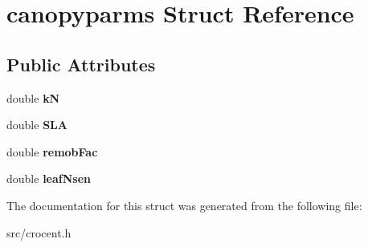 \hypertarget{structcanopyparms}{\section{canopyparms Struct Reference}
\label{structcanopyparms}
}
\subsection*{Public Attributes}
\begin{DoxyCompactItemize}
\item 
\hypertarget{structcanopyparms_a26e6fa2226ef0ecb2c0fe5a51c86f5f3}{double {\bfseries k\-N}}\label{structcanopyparms_a26e6fa2226ef0ecb2c0fe5a51c86f5f3}

\item 
\hypertarget{structcanopyparms_a6150ad94158db49c4c22edab0d2220f5}{double {\bfseries S\-L\-A}}\label{structcanopyparms_a6150ad94158db49c4c22edab0d2220f5}

\item 
\hypertarget{structcanopyparms_a85fae34d8c8d0b4e3597fd1c24c045db}{double {\bfseries remob\-Fac}}\label{structcanopyparms_a85fae34d8c8d0b4e3597fd1c24c045db}

\item 
\hypertarget{structcanopyparms_a4036beafc6f5059644f81051e99fe0e6}{double {\bfseries leaf\-Nsen}}\label{structcanopyparms_a4036beafc6f5059644f81051e99fe0e6}

\end{DoxyCompactItemize}


The documentation for this struct was generated from the following file\-:\begin{DoxyCompactItemize}
\item 
src/crocent.\-h\end{DoxyCompactItemize}

